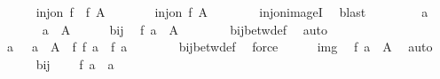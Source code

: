 \begin{isabellebody}
\ \ \ \ \isamarkupfalse%
\ {\isachardoublequoteopen}inj{\isacharunderscore}{\kern0pt}on\ {\isacharparenleft}{\kern0pt}f{\isacharprime}{\kern0pt}\ {\isasymcirc}\ f{\isacharparenright}{\kern0pt}\ A{\isachardoublequoteclose}\isanewline
\ \ \ \ \isamarkupfalse%
\ \isamarkupfalse%
\ {\isachardoublequoteopen}inj{\isacharunderscore}{\kern0pt}on\ f\ A{\isachardoublequoteclose}\isanewline
\ \ \ \ \ \ \isamarkupfalse%
\ inj{\isacharunderscore}{\kern0pt}on{\isacharunderscore}{\kern0pt}imageI{}\ \isamarkupfalse%
\ blast\isanewline
\ \ \isamarkupfalse%
\isanewline
\ \ \ \ \isamarkupfalse%
\ a{\isacharprime}{\kern0pt}\isanewline
\ \ \ \ \isamarkupfalse%
\ {\isacharasterisk}{\kern0pt}{\isacharasterisk}{\kern0pt}{\isacharcolon}{\kern0pt}\ {\isachardoublequoteopen}a{\isacharprime}{\kern0pt}\ {\isasymin}\ A{\isacharprime}{\kern0pt}{\isachardoublequoteclose}\isanewline
\ \ \ \ \isamarkupfalse%
\ bij\ \isamarkupfalse%
\ {\isachardoublequoteopen}f{\isacharprime}{\kern0pt}\ a{\isacharprime}{\kern0pt}\ {\isasymin}\ A{\isacharprime}{\kern0pt}{\isacharprime}{\kern0pt}{\isachardoublequoteclose}\isanewline
\ \ \ \ \ \ \isamarkupfalse%
\ bij{\isacharunderscore}{\kern0pt}betw{\isacharunderscore}{\kern0pt}def\ \isamarkupfalse%
\ auto\isanewline
\ \ \ \ \isamarkupfalse%
\ {\isacharasterisk}{\kern0pt}\ \isamarkupfalse%
\ a\ \ {}{\isacharcolon}{\kern0pt}\ {\isachardoublequoteopen}a\ {\isasymin}\ A\ {\isasymand}\ f{\isacharprime}{\kern0pt}\ {\isacharparenleft}{\kern0pt}f\ a{\isacharparenright}{\kern0pt}\ {\isacharequal}{\kern0pt}\ f{\isacharprime}{\kern0pt}\ a{\isacharprime}{\kern0pt}{\isachardoublequoteclose}\isanewline
\ \ \ \ \ \ \isamarkupfalse%
\ bij{\isacharunderscore}{\kern0pt}betw{\isacharunderscore}{\kern0pt}def\ \isamarkupfalse%
\ force\isanewline
\ \ \ \ \isamarkupfalse%
\ img\ \isamarkupfalse%
\ {\isachardoublequoteopen}f\ a\ {\isasymin}\ A{\isacharprime}{\kern0pt}{\isachardoublequoteclose}\ \isamarkupfalse%
\ auto\isanewline
\ \ \ \ \isamarkupfalse%
\ bij\ {\isacharasterisk}{\kern0pt}{\isacharasterisk}{\kern0pt}\ {}\ \isamarkupfalse%
\ {\isachardoublequoteopen}f\ a\ {\isacharequal}{\kern0pt}\ a{\isacharprime}{\kern0pt}{\isachardoublequoteclose}\isanewline
\ \ \ \ \ \ \isamarkupfalse%

\end{isabellebody}
